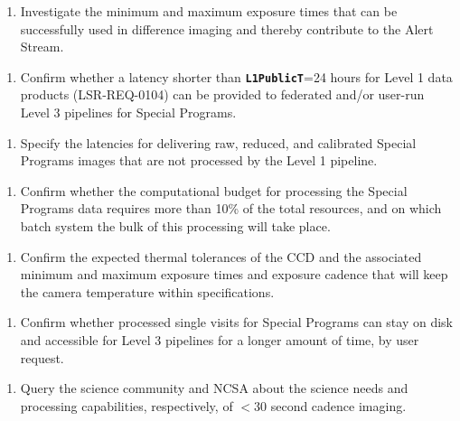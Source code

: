 \documentclass[DM,lsstdraft,toc]{lsstdoc}
\begin{document}
\begin{enumerate}[topsep=-15pt,label= \textbf{Action \Roman*.}] \item Investigate the minimum and maximum exposure times that can be successfully used in difference imaging and thereby contribute to the Alert Stream. \end{enumerate}
\begin{enumerate}[resume,topsep=-15pt,label= \textbf{Action \Roman*.}] \item Confirm whether a latency shorter than {\tt \textbf{L1PublicT}}=24 hours for Level 1 data products (LSR-REQ-0104) can be provided to federated and/or user-run Level 3 pipelines for Special Programs. \end{enumerate}
\begin{enumerate}[resume,topsep=-15pt,label= \textbf{Action \Roman*.}] \item Specify the latencies for delivering raw, reduced, and calibrated Special Programs images that are not processed by the Level 1 pipeline. \end{enumerate}
\begin{enumerate}[resume,topsep=-15pt,label= \textbf{Action \Roman*.}] \item Confirm whether the computational budget for processing the Special Programs data requires more than 10\% of the total resources, and on which batch system the bulk of this processing will take place. \end{enumerate}
\begin{enumerate}[resume,topsep=-15pt,label= \textbf{Action \Roman*.}] \item Confirm the expected thermal tolerances of the CCD and the associated minimum and maximum exposure times and exposure cadence that will keep the camera temperature within specifications. \end{enumerate}
\begin{enumerate}[topsep=-15pt,label= \textbf{Action \Roman*.},resume] \item Confirm whether processed single visits for Special Programs can stay on disk and accessible for Level 3 pipelines for a longer amount of time, by user request. \end{enumerate}
\begin{enumerate}[resume,topsep=-15pt,label= \textbf{Action \Roman*.}] \item Query the science community and NCSA about the science needs and processing capabilities, respectively, of $<30$ second cadence imaging. \end{enumerate}
\end{document}
